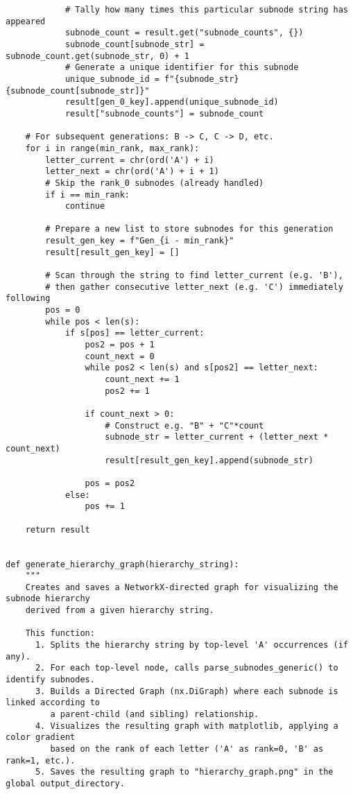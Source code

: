 \begin{lstlisting}
            # Tally how many times this particular subnode string has appeared
            subnode_count = result.get("subnode_counts", {})
            subnode_count[subnode_str] = subnode_count.get(subnode_str, 0) + 1
            # Generate a unique identifier for this subnode
            unique_subnode_id = f"{subnode_str}{subnode_count[subnode_str]}"
            result[gen_0_key].append(unique_subnode_id)
            result["subnode_counts"] = subnode_count

    # For subsequent generations: B -> C, C -> D, etc.
    for i in range(min_rank, max_rank):
        letter_current = chr(ord('A') + i)
        letter_next = chr(ord('A') + i + 1)
        # Skip the rank_0 subnodes (already handled)
        if i == min_rank:
            continue

        # Prepare a new list to store subnodes for this generation
        result_gen_key = f"Gen_{i - min_rank}"
        result[result_gen_key] = []

        # Scan through the string to find letter_current (e.g. 'B'),
        # then gather consecutive letter_next (e.g. 'C') immediately following
        pos = 0
        while pos < len(s):
            if s[pos] == letter_current:
                pos2 = pos + 1
                count_next = 0
                while pos2 < len(s) and s[pos2] == letter_next:
                    count_next += 1
                    pos2 += 1

                if count_next > 0:
                    # Construct e.g. "B" + "C"*count
                    subnode_str = letter_current + (letter_next * count_next)
                    result[result_gen_key].append(subnode_str)

                pos = pos2
            else:
                pos += 1

    return result


def generate_hierarchy_graph(hierarchy_string):
    """
    Creates and saves a NetworkX-directed graph for visualizing the subnode hierarchy
    derived from a given hierarchy string.

    This function:
      1. Splits the hierarchy string by top-level 'A' occurrences (if any).
      2. For each top-level node, calls parse_subnodes_generic() to identify subnodes.
      3. Builds a Directed Graph (nx.DiGraph) where each subnode is linked according to
         a parent-child (and sibling) relationship.
      4. Visualizes the resulting graph with matplotlib, applying a color gradient
         based on the rank of each letter ('A' as rank=0, 'B' as rank=1, etc.).
      5. Saves the resulting graph to "hierarchy_graph.png" in the global output_directory.


\end{lstlisting}
